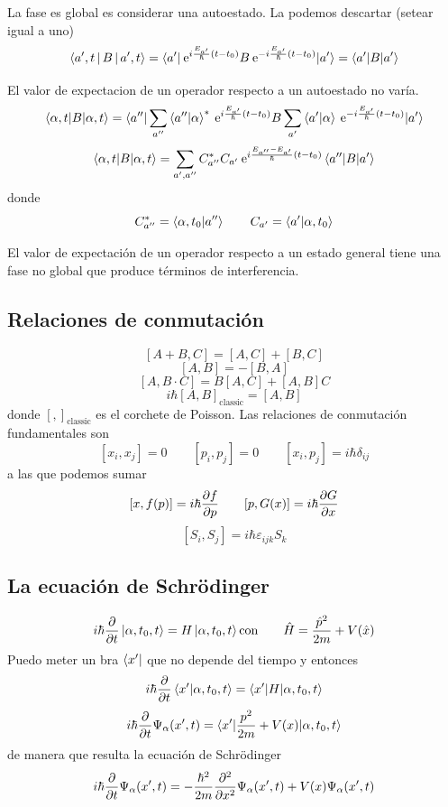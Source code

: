 \documentclass[10pt,oneside]{CBFT_book}
\begin{document}
La fase es global es considerar una autoestado. La podemos descartar (setear igual a uno)
\[
	\Braket{a',t|B|a',t} = 
	\braket{a'|\euler^{i\frac{E_{a'}}{\hbar}(t-t_0)}B\euler^{-i\frac{E_{a'}}{\hbar}(t-t_0)}|a'} = 
	\braket{a'|B|a'}
\]

El valor de expectacion de un operador respecto a un autoestado no varía.
\[
	\braket{\alpha,t|B|\alpha,t} =
	\braket{a''|\sum_{a''} \braket{a''|\alpha}^*\euler^{i\frac{E_{a'}}{\hbar}(t-t_0)} B 
	\sum_{a'} \braket{a'|\alpha} \euler^{-i\frac{E_{a'}}{\hbar}(t-t_0)}|a'}
\]
\[
	\braket{\alpha,t|B|\alpha,t} = \sum_{a',a''} C_{a''}^* C_{a'} 
	\euler^{i\frac{E_{a''}-E_{a'}}{\hbar}(t-t_0)} \braket{a''|  B |a'}
\]
donde 
\[
	C_{a''}^* = \braket{\alpha,t_0|a''} \qquad C_{a'} = \braket{a'| \alpha,t_0}  
\]

El valor de expectación de un operador respecto a un estado general tiene una fase no global que produce términos de 
interferencia.

\subsection{Relaciones de conmutación}

\[
	[ A + B, C] = [A, C] + [B,C] 
\]
\[
	[A, B] = - [B,A]
\]
\[
	[A, B\cdot C] = B[A,C] +  [A,B]C
\]
\[
	i\hbar[ A, B]_{\text{classic}} = [A, B]
\]
donde $[ , ]_{\text{classic}}$ es el corchete de Poisson.
Las relaciones de conmutación fundamentales son 
\[
	[x_i, x_j] = 0 \qquad [p_i, p_j]=0 \qquad [x_i,p_j] =i\hbar\delta_{ij}
\]
a las que podemos sumar
\[
	[x,f(p)] = i\hbar\dpar{f}{p} \qquad [p,G(x)] = i\hbar\dpar{G}{x} 
\]
\[
	[S_i,S_j] = i\hbar \varepsilon_{ijk}S_k
\]

\subsection{La ecuación de Schrödinger}

\[
	i\hbar\dpar{}{t}\Ket{\alpha,t_0,t} = H\Ket{\alpha,t_0,t} \text{con} 
	\qquad \hat{H} = \frac{\hat{p}^2}{2m} + V(\hat{x}) 
\]
Puedo meter un bra $\Bra{x'}$ que no depende del tiempo y entonces 
\[
	i\hbar\dpar{}{t}\braket{x'|\alpha,t_0,t} = \braket{x'|H|\alpha,t_0,t}
\]
\[
	i\hbar\dpar{}{t}\Psi_\alpha(x',t) = \braket{x'|\frac{p^2}{2m} + V(x)|\alpha,t_0,t}
\]
de manera que resulta la ecuación de Schrödinger
\[
	i\hbar\dpar{}{t}\Psi_\alpha(x',t) = -\frac{\hbar^2}{2m}\dpar[2]{}{x}\Psi_\alpha(x',t) + 
	V(x)\Psi_\alpha(x',t)
\]
\end{document}
